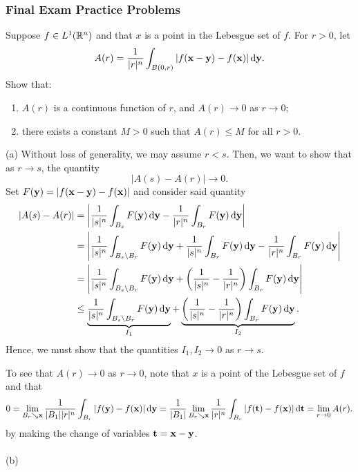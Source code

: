 \subsubsection{Final Exam Practice Problems}
\setcounter{exercise}{0}

\begin{problem}
Suppose $f\in L^1(\mathbb{R}^n)$ and that $x$ is a point in the Lebesgue set of
$f$. For $r>0$, let
\[
A(r)=\frac{1}{|r|^n}\int_{B(0,r)}|f(\mathbf{x}-\mathbf{y})-f(\mathbf{x})|\mathop{}\!\mathrm{d}\mathbf{y}.
\]
Show that:
\begin{enumerate}[label=(\alph*),noitemsep]
\item $A(r)$ is a continuous function of $r$, and $A(r)\to 0$ as $r\to 0$;
\item there exists a constant $M>0$ such that $A(r)\leq M$ for all $r>0$.
\end{enumerate}
\end{problem}
\begin{solution}
(a) Without loss of generality, we may assume $r<s$. Then, we want to show
that as $r\to s$, the quantity
\[
|A(s)-A(r)|\longrightarrow 0.
\]
Set $F(\mathbf{y})= |f(\mathbf{x}-\mathbf{y})-f(\mathbf{x})|$ and consider said quantity
\begin{align*}
|A(s)-A(r)|
&=\left|
\frac{1}{|s|^n}\int_{B_s}F(\bfy)\diff\bfy
-
\frac{1}{|r|^n}\int_{B_r}F(\bfy)\diff\bfy
\right|\\
&=\left|
\frac{1}{|s|^n}\int_{B_s\setminus B_r}F(\bfy)\diff\bfy+
\frac{1}{|s|^n}\int_{B_r}F(\bfy)\diff\bfy-
\frac{1}{|r|^n}\int_{B_r}F(\bfy)\diff\bfy
\right|\\
&=\left|
\frac{1}{|s|^n}\int_{B_s\setminus B_r}F(\bfy)\diff\bfy
+\left(\frac{1}{|s|^n}-\frac{1}{|r|^n}\right)\int_{B_r}F(\bfy)\diff\bfy
\right|\\
&\leq
\underbrace{\frac{1}{|s|^n}\int_{B_s\setminus B_r}F(\bfy)\diff\bfy}_{I_1}
+\underbrace{\left(\frac{1}{|s|^n}-\frac{1}{|r|^n}\right)\int_{B_r}F(\bfy)\diff\bfy}_{I_2}.
\end{align*}
Hence, we must show that the quantities $I_1,I_2\to 0$ as $r\to s$.

To see that $A(r)\to 0$ as $r\to 0$, note that $x$ is a point of the
Lebesgue set of $f$ and that
\[
0=\lim_{B_r\searrow\mathbf{x}}\frac{1}{|B_1||r|^n}\int_{B_r}|f(\mathbf{y})-f(\mathbf{x})|\mathop{}\!\mathrm{d}\mathbf{y}=\frac{1}{|B_1|}\lim_{B_r\searrow\mathbf{x}}\frac{1}{|r|^n}\int_{B_r}|f(\mathbf{t})-f(\mathbf{x})|\mathop{}\!\mathrm{d}\mathbf{t}=\lim_{r\to
0}A(r).
\]
by making the change of variables $\mathbf{t}=\mathbf{x}-\mathbf{y}$.
\\\\
(b)
\end{solution}

